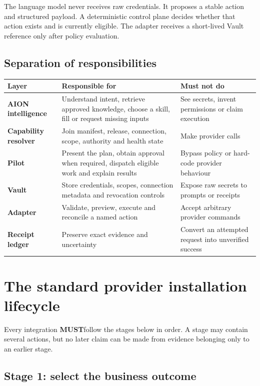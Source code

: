 \documentclass[11pt,a4paper]{article}
\newcommand{\must}{\textbf{MUST}}
\begin{document}
The language model never receives raw credentials. It proposes a stable action
and structured payload. A deterministic control plane decides whether that
action exists and is currently eligible. The adapter receives a short-lived
Vault reference only after policy evaluation.

\subsection{Separation of responsibilities}

\begin{tabularx}{\textwidth}{>{\bfseries}p{32mm}X X}
\toprule
Layer & Responsible for & Must not do \\
\midrule
AION intelligence & Understand intent, retrieve approved knowledge, choose a skill, fill or request missing inputs & See secrets, invent permissions or claim execution \\
Capability resolver & Join manifest, release, connection, scope, authority and health state & Make provider calls \\
Pilot & Present the plan, obtain approval when required, dispatch eligible work and explain results & Bypass policy or hard-code provider behaviour \\
Vault & Store credentials, scopes, connection metadata and revocation controls & Expose raw secrets to prompts or receipts \\
Adapter & Validate, preview, execute and reconcile a named action & Accept arbitrary provider commands \\
Receipt ledger & Preserve exact evidence and uncertainty & Convert an attempted request into unverified success \\
\bottomrule
\end{tabularx}

\section{The standard provider installation lifecycle}

Every integration \must follow the stages below in order. A stage may contain
several actions, but no later claim can be made from evidence belonging only to
an earlier stage.

\subsection{Stage 1: select the business outcome}
\end{document}
